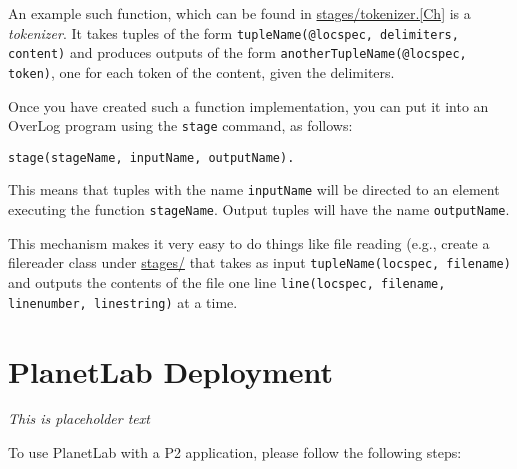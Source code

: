 \documentclass{article}
\begin{document}
An example such function, which can be found in
\url{stages/tokenizer.[Ch]} is a \emph{tokenizer}. It takes tuples of
the form \lstinline$tupleName(@locspec, delimiters, content)$ and
produces outputs of the form
\lstinline$anotherTupleName(@locspec, token)$, one for each token of the content, given the delimiters. 

Once you have created such a function implementation, you can put it
into an OverLog program using the \lstinline$stage$ command, as follows: 
\begin{lstlisting}
stage(stageName, inputName, outputName).
\end{lstlisting}

This means that tuples with the name \lstinline$inputName$ will be
directed to an element executing the function
\lstinline$stageName$. Output tuples will have the name
\lstinline$outputName$. 

This mechanism makes it very easy to do things like file reading (e.g.,
create a filereader class under \url{stages/} that takes as input
\lstinline$tupleName(locspec, filename)$ and outputs the contents of the file one
line \lstinline$line(locspec, filename, linenumber, linestring)$ at a
time.








\section{PlanetLab Deployment}
\emph{This is placeholder text}

To use PlanetLab with a P2 application, please follow the following steps:
\end{document}
